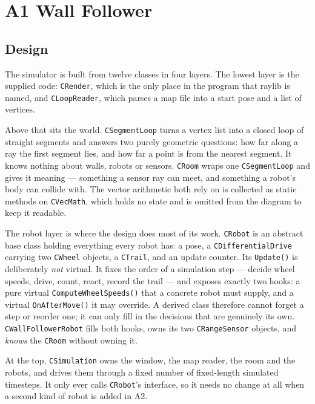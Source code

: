 \documentclass[10pt]{article}
\begin{document}
\section{A1 Wall Follower}

\subsection{Design}

The simulator is built from twelve classes in four layers. The lowest layer is
the supplied code: \texttt{CRender}, which is the only place in the program
that raylib is named, and \texttt{CLoopReader}, which parses a map file into a
start pose and a list of vertices.

Above that sits the world. \texttt{CSegmentLoop} turns a vertex list into a
closed loop of straight segments and answers two purely geometric questions:
how far along a ray the first segment lies, and how far a point is from the
nearest segment. It knows nothing about walls, robots or sensors.
\texttt{CRoom} wraps one \texttt{CSegmentLoop} and gives it meaning ---
something a sensor ray can meet, and something a robot's body can collide
with. The vector arithmetic both rely on is collected as static methods on
\texttt{CVecMath}, which holds no state and is omitted from the diagram to
keep it readable.

The robot layer is where the design does most of its work.
\texttt{CRobot} is an abstract base class holding everything every robot has:
a pose, a \texttt{CDifferentialDrive} carrying two \texttt{CWheel} objects, a
\texttt{CTrail}, and an update counter. Its \texttt{Update()} is deliberately
\emph{not} virtual. It fixes the order of a simulation step --- decide wheel
speeds, drive, count, react, record the trail --- and exposes exactly two
hooks: a pure virtual \texttt{ComputeWheelSpeeds()} that a concrete robot must
supply, and a virtual \texttt{OnAfterMove()} it may override. A derived class
therefore cannot forget a step or reorder one; it can only fill in the
decisions that are genuinely its own. \texttt{CWallFollowerRobot} fills both
hooks, owns its two \texttt{CRangeSensor} objects, and \emph{knows} the
\texttt{CRoom} without owning it.

At the top, \texttt{CSimulation} owns the window, the map reader, the room and
the robots, and drives them through a fixed number of fixed-length simulated
timesteps. It only ever calls \texttt{CRobot}'s interface, so it needs no
change at all when a second kind of robot is added in A2.
\end{document}
